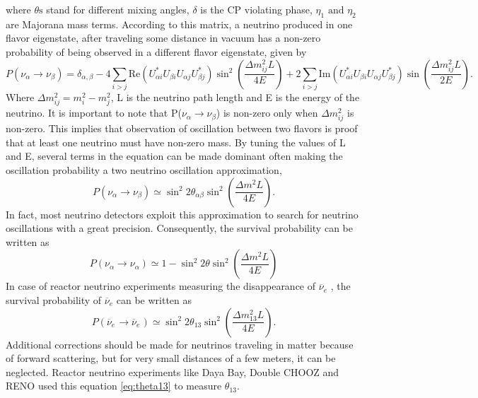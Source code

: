 \documentclass[11pt]{article}
\newcommand{\nuebar}{\ensuremath{\overline{\nu }_{e}} \hspace{1pt}}
\numberwithin{equation}{section}
\begin{document}
where $\theta \text{s}$ stand for different mixing angles, $\delta$ is the CP violating phase, $\eta_{1} \text{ and } \eta_{2}$ are Majorana mass terms. 
According to this matrix, a neutrino produced in one flavor eigenstate, after traveling some distance in vacuum has a non-zero probability of being observed in a different flavor eigenstate, given by 
\begin{equation} P(\nu_{\alpha} \rightarrow \nu_{\beta})=\delta_{\alpha, \beta}-4 \sum\limits_{i>j} \text{Re}(U^{*}_{\alpha i} U_{\beta i}U_{\alpha j}U^{*}_{\beta j})  \sin^{2}(\frac{\Delta m^{2}_{ij} L}{4 E}) +2 \sum\limits_{i>j} \text{Im}(U^{*}_{\alpha i} U_{\beta i}U_{\alpha j}U^{*}_{\beta j}) \sin(\frac{\Delta m^{2}_{ij} L}{2 E}) .
\end{equation}
Where $\Delta m^{2}_{ij}=m^{2}_{i}-m^{2}_{j}$, L is the neutrino path length and E is the energy of the neutrino. It is important to note that P($\nu_{\alpha} \rightarrow \nu_{\beta}$) is non-zero only when $\Delta m^{2}_{ij}$ is non-zero. This implies that observation of oscillation between two flavors is proof that at least one neutrino must have non-zero mass. By tuning the values of L and E, several terms in the equation can be made dominant often making the oscillation probability a two neutrino oscillation approximation,
\begin{equation}
 P(\nu_{\alpha} \rightarrow \nu_{\beta})\simeq\sin^{2}2\theta_{\alpha \beta} \sin^{2}(\frac{\Delta m^{2} L}{4 E}) .
 \end{equation}
In fact, most neutrino detectors exploit this approximation to search for neutrino oscillations with a great precision. Consequently, the survival probability can be written as 
\begin{equation} 
P(\nu_{\alpha} \rightarrow \nu_{\alpha}) \simeq 1-\sin^{2}2\theta \sin^{2}(\frac{\Delta m^{2} L}{4 E}) 
\end{equation}
In case of reactor neutrino experiments measuring the disappearance of \nuebar, the survival probability of \nuebar can be written as 
\begin{equation}
\label{eq:theta13}
 P(\nuebar \rightarrow \nuebar)\simeq\sin^{2}2\theta_{13} \sin^{2}(\frac{\Delta m^{2}_{13} L}{4 E}) .
 \end{equation}
Additional corrections should be made for neutrinos traveling in matter because of forward scattering, but for very small distances of a few meters, it can be neglected. Reactor neutrino experiments like Daya Bay, Double CHOOZ and RENO used this equation \ref{eq:theta13} to measure $\theta_{13}$.
\end{document}
